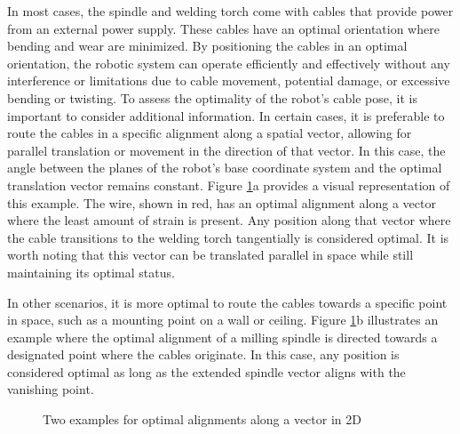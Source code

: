 In most cases, the spindle and welding torch come with cables that provide power from an external power supply. These cables have an optimal orientation where bending and wear are minimized. By positioning the cables in an optimal orientation, the robotic system can operate efficiently and effectively without any interference or limitations due to cable movement, potential damage, or excessive bending or twisting. To assess the optimality of the robot's cable pose, it is important to consider additional information. In certain cases, it is preferable to route the cables in a specific alignment along a spatial vector, allowing for parallel translation or movement in the direction of that vector. In this case, the angle between the planes of the robot's base coordinate system and the optimal translation vector remains constant. Figure \ref{OOPti}a provides a visual representation of this example. The wire, shown in red, has an optimal alignment along a vector where the least amount of strain is present. Any position along that vector where the cable transitions to the welding torch tangentially is considered optimal. It is worth noting that this vector can be translated parallel in space while still maintaining its optimal status.

In other scenarios, it is more optimal to route the cables towards a specific point in space, such as a mounting point on a wall or ceiling. Figure \ref{OOPti}b illustrates an example where the optimal alignment of a milling spindle is directed towards a designated point where the cables originate. In this case, any position is considered optimal as long as the extended spindle vector aligns with the vanishing point.
\newpage

\begin{figure}[H]%
	\centering
	\qquad
	\caption{Two examples for optimal alignments along a vector in 2D}%
	\label{OOPti}%
\end{figure}




